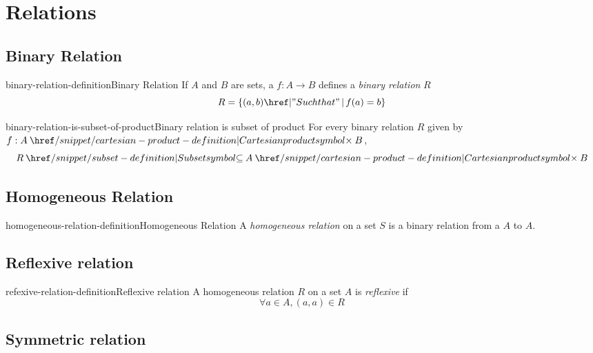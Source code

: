 \documentclass[preview]{standalone}
\begin{document}
\genpage

\section{Relations}

\subsection{Binary Relation}

\begin{snippetdefinition}{binary-relation-definition}{Binary Relation}
    If \(A\) and \(B\) are sets, a \function \(f\colon A\to B\)
    defines a \textit{binary relation} \(R\)
    \[
        R = \{(a,b) \suchthat f(a)=b\}
    \]
\end{snippetdefinition}

\begin{snippetcorollary}{binary-relation-is-subset-of-product}{Binary relation is subset of product}
    For every binary relation \(R\) given by \(f: A \cartesianprod B\),
    \[R\subseteq A\cartesianprod B\]
\end{snippetcorollary}

\subsection{Homogeneous Relation}

\begin{snippetdefinition}{homogeneous-relation-definition}{Homogeneous Relation}
    A \textit{homogeneous relation} on a set \(S\) is a binary relation
    from a \(A\) to \(A\).
\end{snippetdefinition}

\subsection{Reflexive relation}

\begin{snippetdefinition}{refexive-relation-definition}{Reflexive relation}
    A homogeneous relation \(R\) on a set \(A\) is \textit{reflexive}
    if
    \[
        \forall a\in A, (a,a) \in R
    \]
\end{snippetdefinition}

\subsection{Symmetric relation}
\end{document}
